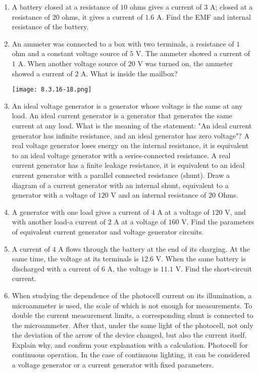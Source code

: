 \documentclass{article}
\begin{document}
\begin{enumerate}[label=8.3.\arabic*]
\item A battery closed at a resistance of $10$ ohms gives a current of $3$ A; closed at a resistance of $20$ ohms, it gives a current of $1.6$ A. Find the EMF and internal resistance of the battery.

\item An ammeter was connected to a box with two terminals, a resistance of $1$ ohm and a constant voltage source of $5$ V. The ammeter showed a current of $1$ A. When another voltage source of $20$ V was turned on, the ammeter showed a current of $2$ A. What is inside the mailbox?

\begin{center}
    \texttt{[image: 8.3.16-18.png]}
\end{center}


\item An ideal voltage generator is a generator whose voltage is the same at any load. An ideal current generator is a generator that generates the same current at any load. What is the meaning of the statement: "An ideal current generator has infinite resistance, and an ideal generator has zero voltage"? A real voltage generator loses energy on the internal resistance, it is equivalent to an ideal voltage generator with a series-connected resistance. A real current generator has a finite leakage resistance, it is equivalent to an ideal current generator with a parallel connected resistance (shunt). Draw a diagram of a current generator with an internal shunt, equivalent to a generator with a voltage of $120$ V and an internal resistance of $20$ Ohms.

\item A generator with one load gives a current of $4$ A at a voltage of $120$ V, and with another load-a current of $2$ A at a voltage of $160$ V. Find the parameters of equivalent current generator and voltage generator circuits.

\item A current of $4$ A flows through the battery at the end of its charging. At the same time, the voltage at its terminals is $12.6$ V. When the same battery is discharged with a current of $6$ A, the voltage is $11.1$ V. Find the short-circuit current.

\item When studying the dependence of the photocell current on its illumination, a microammeter is used, the scale of which is not enough for measurements. To double the current measurement limits, a corresponding shunt is connected to the microammeter. After that, under the same light of the photocell, not only the deviation of the arrow of the device changed, but also the current itself. Explain why, and confirm your explanation with a calculation. Photocell for continuous operation. In the case of continuous lighting, it can be considered a voltage generator or a current generator with fixed parameters.
 


\end{enumerate}
\end{document}
